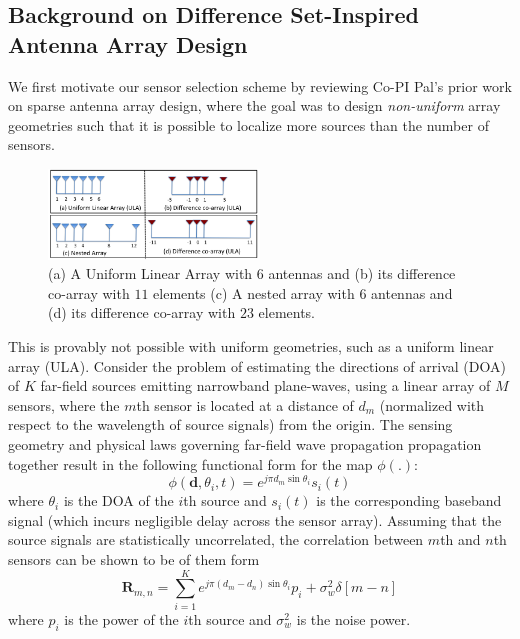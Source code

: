\subsection{Background on Difference Set-Inspired Antenna Array Design}
We first motivate our sensor selection scheme by reviewing Co-PI Pal's prior work on sparse antenna array design, where the goal was to design {\em non-uniform} array geometries such that it is possible to localize more sources than the number of sensors. 
\begin{figure}
\begin{center}
\includegraphics[width=0.5\textwidth]{figs/FigNested.png}
\end{center}
\caption{\label{fig:Nested}  (a) A Uniform Linear Array with $6$ antennas and (b) its difference co-array with $11$ elements (c) A nested array with $6$ antennas and (d) its difference co-array with $23$ elements.}
\end{figure}
This is provably not possible with uniform geometries, such as a uniform linear array (ULA). Consider the problem of estimating the directions of arrival (DOA) of $K$ far-field sources emitting narrowband plane-waves, using a linear array of $M$ sensors, where the $m$th sensor is located at a distance of $d_m$ (normalized with respect to the wavelength of source signals) from the origin. 
The sensing geometry and physical laws governing far-field wave propagation propagation together result in the following functional form for the map $\phi(.)$: \[ \phi(\mathbf{d},\theta_i,t) =  e^{j\pi d_m \sin\theta_i}s_i(t)  \]
where $\theta_i$ is the DOA of the $i$th source and $s_i(t)$ is the corresponding baseband signal (which incurs negligible delay across the sensor array). Assuming that the source signals are statistically uncorrelated, the correlation between $m$th and $n$th sensors can be shown to be of them form \[ \mathbf{R}_{m,n} = \sum_{i=1}^{K}e^{j\pi (d_m-d_n)\sin\theta_i} p_i + \sigma^2_w\delta[m-n] \]
where $p_i$ is the power of the $i$th source and $\sigma^2_w$ is the noise power. 
